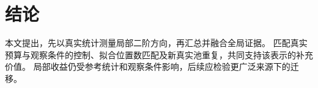 \section{结论}
\label{sec:conclusion}

本文提出\method，先以真实统计测量局部二阶方向，再汇总并融合全局证据。
匹配真实预算与观察条件的控制、拟合位置数匹配及新真实池重复，共同支持该表示的补充价值。
局部收益仍受参考统计和观察条件影响，后续应检验更广泛来源下的迁移。
